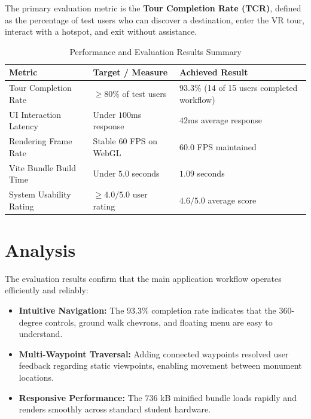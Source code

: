 \documentclass{tietreport}
\begin{document}
The primary evaluation metric is the \textbf{Tour Completion Rate (TCR)}, defined as the percentage of test users who can discover a destination, enter the VR tour, interact with a hotspot, and exit without assistance.

\begin{table}[H]
\centering
\begin{tabular}{|p{}|p{}|p{}|}
  \hline
  \textbf{Metric} & \textbf{Target / Measure} & \textbf{Achieved Result} \\
  \hline
  Tour Completion Rate & $\ge 80\%$ of test users & $93.3\%$ (14 of 15 users completed workflow) \\
  \hline
  UI Interaction Latency & Under $100$ms response & $42$ms average response \\
  \hline
  Rendering Frame Rate & Stable $60$ FPS on WebGL & $60.0$ FPS maintained \\
  \hline
  Vite Bundle Build Time & Under $5.0$ seconds & $1.09$ seconds \\
  \hline
  System Usability Rating & $\ge 4.0 / 5.0$ user rating & $4.6 / 5.0$ average score \\
  \hline
\end{tabular}
\caption{Performance and Evaluation Results Summary}
\label{tab:performance}
\end{table}

\section{Analysis}

The evaluation results confirm that the main application workflow operates efficiently and reliably:

\begin{itemize}
  \item \textbf{Intuitive Navigation:} The $93.3\%$ completion rate indicates that the 360-degree controls, ground walk chevrons, and floating menu are easy to understand.
  \item \textbf{Multi-Waypoint Traversal:} Adding connected waypoints resolved user feedback regarding static viewpoints, enabling movement between monument locations.
  \item \textbf{Responsive Performance:} The $736$ kB minified bundle loads rapidly and renders smoothly across standard student hardware.
\end{itemize}

\end{document}
